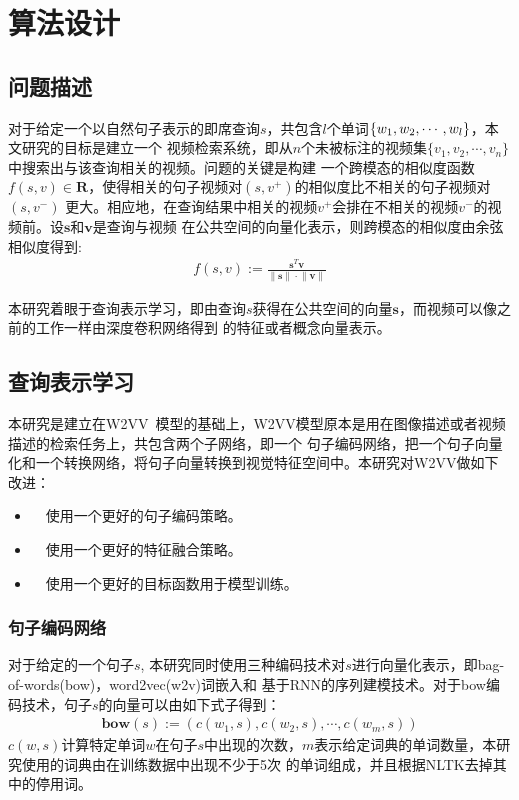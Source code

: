 \chapter{算法设计}

\section{问题描述}
对于给定一个以自然句子表示的即席查询$s$，共包含$l$个单词$\{w_1,w_2,\cdots,\\w_l\}$，本文研究的目标是建立一个
视频检索系统，即从$n$个未被标注的视频集$\{v_1,v_2,\cdots,v_n\}$中搜索出与该查询相关的视频。问题的关键是构建
一个跨模态的相似度函数$f(s,v) \in \mathbf{R}$，使得相关的句子视频对$(s,v^+)$的相似度比不相关的句子视频对$(s,v^-)$
更大。相应地，在查询结果中相关的视频$v^+$会排在不相关的视频$v^-$的视频前。设$\mathbf{s}$和$\mathbf{v}$是查询与视频
在公共空间的向量化表示，则跨模态的相似度由余弦相似度得到:
\begin{equation}
    \label{eq:cosine-sim}
    \begin{aligned}
        f(s,v) := \frac{\mathbf{s}^T\mathbf{v}}{\left\| \mathbf{s} \right\| \cdot \left\| \mathbf{v} \right\|}
    \end{aligned}
\end{equation}

本研究着眼于查询表示学习，即由查询$s$获得在公共空间的向量$\mathbf{s}$，而视频可以像之前的工作一样由深度卷积网络得到
的特征或者概念向量表示。

\section{查询表示学习}
本研究是建立在W2VV~\cite{dong2018predicting}模型的基础上，W2VV模型原本是用在图像描述或者视频描述的检索任务上，共包含两个子网络，即一个
句子编码网络，把一个句子向量化和一个转换网络，将句子向量转换到视觉特征空间中。本研究对W2VV做如下改进：
\begin{itemize}
    \item　使用一个更好的句子编码策略。

    \item　使用一个更好的特征融合策略。

    \item　使用一个更好的目标函数用于模型训练。
\end{itemize}

\subsection{句子编码网络}
对于给定的一个句子$s$, 本研究同时使用三种编码技术对$s$进行向量化表示，即bag-of-words(bow)，word2vec(w2v)词嵌入和
基于RNN的序列建模技术。对于bow编码技术，句子$s$的向量可以由如下式子得到：
\begin{equation}
    \label{eq:bow}
    \begin{aligned}
        \bm{\mathbf{bow}}(s) := (c(w_1,s),c(w_2,s),\cdots,c(w_m,s))
    \end{aligned}
\end{equation}
$c(w,s)$计算特定单词$w$在句子$s$中出现的次数，$m$表示给定词典的单词数量，本研究使用的词典由在训练数据中出现不少于5次
的单词组成，并且根据NLTK去掉其中的停用词。

